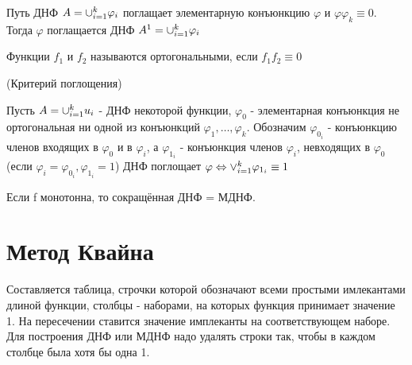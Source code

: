 \documentclass{article}
\begin{document}
\lemma Путь ДНФ $A = \Large\cup_{i=1}^k\varphi_i$ поглащает элементарную конъюнкцию $\varphi$ и $\varphi \varphi_k \equiv 0$. Тогда $\varphi$ поглащается ДНФ $A^1=\Large\cup_{i=1}^k\varphi_i$

\opr Функции $f_1$ и $f_2$ называются ортогональными, если $f_1f_2 \equiv 0$

\thr(Критерий поглощения)\par
Пусть  $A=\Large\cup_{i=1}^k\Large u_i$ - ДНФ некоторой функции, $\varphi_0$ - элементарная конъюнкция не ортогональная ни одной из конъюнкций $\varphi_1, \dotsc,\varphi_k$. Обозначим $\varphi_{0_i}$ - конъюнкцию членов входящих в $\varphi_0$  и в $\varphi_i$, а $\varphi_{1_i}$ - конъюнкция членов $\varphi_i$, невходящих в $\varphi_0$ (если $\varphi_i = \varphi_{0_i}, \varphi_{1_i} = 1$) ДНФ поглощает $\varphi \Leftrightarrow \Large\vee_{i=1}^k\varphi_{1_i} \equiv 1$

\utv Если f монотонна, то сокращённая ДНФ = МДНФ.

\section {Метод Квайна}
Составляется таблица, строчки которой обозначают всеми простыми имлекантами длиной функции, столбцы - наборами, на которых функция принимает значение 1. На пересечении ставится значение имплеканты на соответствующем наборе. Для построения ДНФ или МДНФ надо удалять строки так, чтобы в каждом столбце была хотя бы одна 1.
\end{document}
